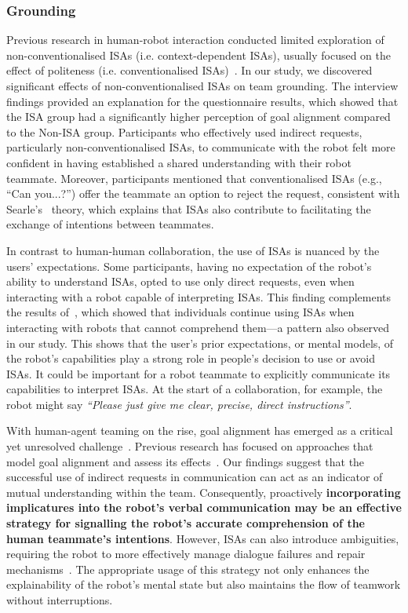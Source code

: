 \subsubsection{Grounding}
Previous research in human-robot interaction conducted limited exploration of non-conventionalised ISAs (i.e. context-dependent ISAs), usually focused on the effect of politeness (i.e. conventionalised ISAs)~\cite{seok2022cultural, williams2018thank}. In our study, we discovered significant effects of non-conventionalised ISAs on team grounding. The interview findings provided an explanation for the questionnaire results, which showed that the ISA group had a significantly higher perception of goal alignment compared to the Non-ISA group. Participants who effectively used indirect requests, particularly non-conventionalised ISAs, to communicate with the robot felt more confident in having established a shared understanding with their robot teammate. 
Moreover, participants mentioned that conventionalised ISAs (e.g., ``Can you...?'') offer the teammate an option to reject the request, consistent with Searle’s~\cite{searle1975indirect} theory, which explains that ISAs also contribute to facilitating the exchange of intentions between teammates. 

In contrast to human-human collaboration, the use of ISAs is nuanced by the users' expectations. Some participants, having no expectation of the robot's ability to understand ISAs, opted to use only direct requests, even when interacting with a robot capable of interpreting ISAs. This finding complements the results of~\cite{briggs2017enabling}, which showed that individuals continue using ISAs when interacting with robots that cannot comprehend them—a pattern also observed in our study. This shows that the user's prior expectations, or mental models, of the robot's capabilities play a strong role in people's decision to use or avoid ISAs. It could be important for a robot teammate to explicitly communicate its capabilities to interpret ISAs. At the start of a collaboration, for example, the robot might say \textit{``Please just give me clear, precise, direct instructions''}.

With human-agent teaming on the rise, goal alignment has emerged as a critical yet unresolved challenge~\cite{bhat2024value, zhang2025implicit}. Previous research has focused on  approaches that model goal alignment and assess its effects~\cite{li2022modeling, sanneman2023validating}. Our findings suggest that the successful use of indirect requests in communication can act as an indicator of mutual understanding within the team. Consequently, proactively \textbf{incorporating implicatures into the robot’s verbal communication may be an effective strategy for signalling the robot’s accurate comprehension of the human teammate’s intentions}. However, ISAs can also introduce ambiguities, requiring the robot to more effectively manage dialogue failures and repair mechanisms~\cite{kontogiorgos2021systematic}. The appropriate usage of this strategy not only enhances the explainability of the robot's mental state but also maintains the flow of teamwork without interruptions.

